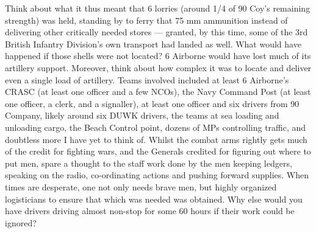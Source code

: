 \documentclass[noraggedright]{turabian-researchpaper}
\begin{document}
Think about what it thus meant that 6 lorries (around 1/4 of 90 Coy's remaining
strength) was held, standing by to ferry that 75 mm ammunition instead of 
delivering other critically needed stores --- granted, by this time, some of
the 3rd British Infantry Division's own transport had landed as well.  What
would have happened if those shells were not located?  6 Airborne would have
lost much of its artillery support.  Moreover, think about how complex it was
to locate and deliver even a single load of artillery.  Teams involved included
at least 6 Airborne's CRASC (at least one officer and a few NCOs), the Navy
Command Post (at least one officer, a clerk, and a signaller), at least one
officer and six drivers from 90 Company, likely around six DUWK drivers, the
teams at sea loading and unloading cargo, the Beach Control point, dozens of 
MPs controlling traffic, and doubtless more I have yet to think of.  Whilst 
the combat arms rightly gets much of the credit for fighting wars, and the
Generals credited for figuring out where to put men, spare a thought to the
staff work done by the men keeping ledgers, speaking on the radio, 
co-ordinating actions and pushing forward supplies.  When times are desperate, 
one not only needs brave men, but highly organized logisticians to ensure
that which was needed was obtained. Why else would you have drivers driving
almost non-stop for some 60 hours if their work could be ignored?


%
%
%
%
%
%
%
%
%
%
%
\end{document}
